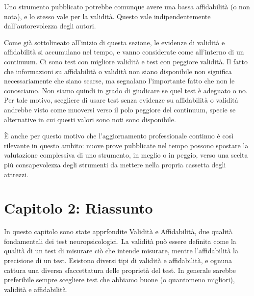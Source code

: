 \documentclass[
  italian,
  letterpaper,
  paper=A4,
  headinclude=on,
  footinclude=on,
  12pt]{scrbook}
\begin{document}
\begin{tcolorbox}[enhanced jigsaw, left=2mm, colbacktitle=quarto-callout-important-color!10!white, bottomrule=.15mm, opacityback=0, coltitle=black, colframe=quarto-callout-important-color-frame, opacitybacktitle=0.6, leftrule=.75mm, colback=white, toprule=.15mm, title=\textcolor{quarto-callout-important-color}{\faExclamation}\hspace{0.5em}{Il fatto che un test sia pubblicato non garantisce che abbia validità e
affidabilità sufficienti.}, titlerule=0mm, arc=.35mm, breakable, rightrule=.15mm, bottomtitle=1mm, toptitle=1mm]

Uno strumento pubblicato potrebbe comunque avere una bassa affidabilità
(o non nota), e lo stesso vale per la validità. Questo vale
indipendentemente dall'autorevolezza degli autori.

\end{tcolorbox}

Come già sottolineato all'inizio di questa sezione, le evidenze di
validità e affidabilità si accumulano nel tempo, e vanno considerate
come all'interno di un continuum. Ci sono test con migliore validità e
test con peggiore validità. Il fatto che informazioni su affidabilità o
validità non siano disponibile non significa necessariamente che siano
scarse, ma segnalano l'importante fatto che non le conosciamo. Non siamo
quindi in grado di giudicare se quel test è adeguato o no. Per tale
motivo, scegliere di usare test senza evidenze su affidabilità o
validità andrebbe visto come muoversi verso il polo peggiore del
continuum, specie se alternative in cui questi valori sono noti sono
disponibile.

È anche per questo motivo che l'aggiornamento professionale continuo è
così rilevante in questo ambito: nuove prove pubblicate nel tempo
possono spostare la valutazione complessiva di uno strumento, in meglio
o in peggio, verso una scelta più consapevolezza degli strumenti da
mettere nella propria cassetta degli attrezzi.

\section{Capitolo 2: Riassunto}\label{capitolo-2-riassunto}

In questo capitolo sono state apprfondite Validità e Affidabilità, due
qualità fondamentali dei test neuropsicologici. La validità può essere
definita come la qualità di un test di misurare ciò che intende
misurare, mentre l'affidabilità la precisione di un test. Esistono
diversi tipi di validità e affidabilità, e ognuna cattura una diversa
sfaccettatura delle proprietà del test. In generale sarebbe preferibile
sempre scegliere test che abbiamo buone (o quantomeno migliori),
validità e affidabilità.
\end{document}
